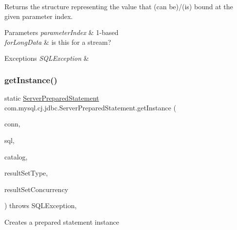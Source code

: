 Returns the structure representing the value that (can be)/(is) bound at the given parameter index.


\begin{DoxyParams}{Parameters}
{\em parameter\+Index} & 1-\/based \\
\hline
{\em for\+Long\+Data} & is this for a stream? \\
\hline
\end{DoxyParams}

\begin{DoxyExceptions}{Exceptions}
{\em S\+Q\+L\+Exception} & \\
\hline
\end{DoxyExceptions}
\mbox{\label{classcom_1_1mysql_1_1cj_1_1jdbc_1_1_server_prepared_statement_a6108da4da92d15f3ed8bc5ceba8c3005}} 
\subsubsection{\texorpdfstring{get\+Instance()}{getInstance()}}
{\footnotesize\ttfamily static \mbox{\hyperlink{classcom_1_1mysql_1_1cj_1_1jdbc_1_1_server_prepared_statement}{Server\+Prepared\+Statement}} com.\+mysql.\+cj.\+jdbc.\+Server\+Prepared\+Statement.\+get\+Instance (\begin{DoxyParamCaption}\item[{\mbox{\hyperlink{interfacecom_1_1mysql_1_1cj_1_1jdbc_1_1_jdbc_connection}{Jdbc\+Connection}}}]{conn,  }\item[{String}]{sql,  }\item[{String}]{catalog,  }\item[{int}]{result\+Set\+Type,  }\item[{int}]{result\+Set\+Concurrency }\end{DoxyParamCaption}) throws S\+Q\+L\+Exception\hspace{0.3cm}{\ttfamily [static]}, {\ttfamily [protected]}}

Creates a prepared statement instance \mbox{\label{classcom_1_1mysql_1_1cj_1_1jdbc_1_1_server_prepared_statement_aefecf860aaca8eb21a3ffbe775225e56}} 

